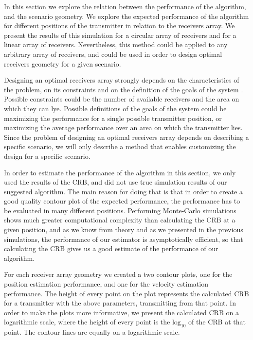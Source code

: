 In this section we explore the relation between the performance of the algorithm, and the scenario geometry. 
We explore the expected performance of the algorithm for different positions of the transmitter in relation to the receivers array. We present the results of this simulation for a circular array of receivers and for a linear array of receivers. Nevertheless, this method could be applied to any arbitrary array of receivers, and could be used in order to design optimal receivers geometry for a given scenario.

Designing an optimal receivers array strongly depends on the characteristics of the problem, on its constraints and on the definition of the goals of the system \cite{fowler_wu}. Possible constraints could be the number of available receivers and the area on which they can lye. Possible definitions of the goals of the system could be maximizing the performance for a single possible transmitter position, or maximizing the average performance over an area on which the transmitter lies. Since the problem of designing an optimal receivers array depends on describing a specific scenario, we will only describe a method that enables customizing the design for a specific scenario.

In order to estimate the performance of the algorithm in this section, we only used the results of the CRB, 
and did not use true simulation results of our suggested algorithm. The main reason for doing that is that in order to create a good quality contour plot of the expected performance, the performance has to be evaluated in many different positions. Performing Monte-Carlo simulations shows much greater computational complexity than calculating the CRB at a given position, and as we know from theory and as we presented in the previous simulations, the performance of our estimator is asymptotically efficient, so that calculating the CRB gives us a good estimate of the performance of our algorithm.

For each receiver array geometry we created a two contour plots, one for the position estimation performance, and one for the velocity estimation performance. The height of every point on the plot represents the calculated CRB for a transmitter with the above parameters, transmitting from that point. In order to make the plots more informative, we present the calculated CRB on a logarithmic scale, where the height of every point is the $\text{log}_{10}$ of the CRB at that point. The contour lines are equally on a logarithmic scale.

